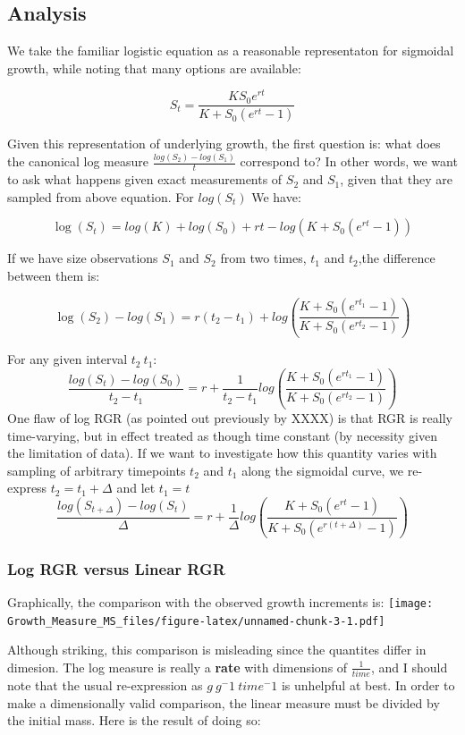 \documentclass[]{article}
\begin{document}
\subsection{Analysis}\label{analysis}

We take the familiar logistic equation as a reasonable representaton for
sigmoidal growth, while noting that many options are available:

\[S_t = \frac{KS_0e^{rt}}{K+S_0(e^{rt}-1)}\]

Given this representation of underlying growth, the first question is:
what does the canonical log measure \(\frac{log(S_2) - log(S_1)}{t}\)
correspond to? In other words, we want to ask what happens given exact
measurements of \(S_2\) and \(S_1\), given that they are sampled from
above equation. For \(log(S_t)\) We have:

\[\log(S_t) = log(K) + log(S_0) + rt - log(K + S_0(e^{rt}-1))\]

If we have size observations \(S_1\) and \(S_2\) from two times, \(t_1\)
and \(t_2\),the difference between them is:

\[\log(S_2) - log(S_1) = r(t_2 - t_1) + log(\frac{K + S_0(e^{rt_1}-1)}{K + S_0(e^{rt_2}-1)})\]

For any given interval \(t_2~t_1\):\\
\[\frac{log(S_t) - log(S_0)}{t_2 - t_1} = r + \frac{1}{t_2-t_1}log(\frac{K + S_0(e^{rt_1}-1)}{K + S_0(e^{rt_2}-1)})\]
One flaw of log RGR (as pointed out previously by XXXX) is that RGR is
really time-varying, but in effect treated as though time constant (by
necessity given the limitation of data). If we want to investigate how
this quantity varies with sampling of arbitrary timepoints \(t_2\) and
\(t_1\) along the sigmoidal curve, we re-express \(t_2=t_1+\Delta\) and
let \(t_1=t\)
\[\frac{log(S_{t+\Delta}) - log(S_t)}{\Delta} = r + \frac{1}{\Delta}log(\frac{K + S_0(e^{rt}-1)}{K + S_0(e^{r({t+\Delta})}-1)})\]

\subsubsection{Log RGR versus Linear
RGR}\label{log-rgr-versus-linear-rgr}

Graphically, the comparison with the observed growth increments is:
\texttt{[image: Growth\_Measure\_MS\_files/figure-latex/unnamed-chunk-3-1.pdf]}

Although striking, this comparison is misleading since the quantites
differ in dimesion. The log measure is really a \textbf{rate} with
dimensions of \(\frac{1}{time}\), and I should note that the usual
re-expression as \(g~g^-1~time^-1\) is unhelpful at best. In order to
make a dimensionally valid comparison, the linear measure must be
divided by the initial mass. Here is the result of doing so:
\end{document}
